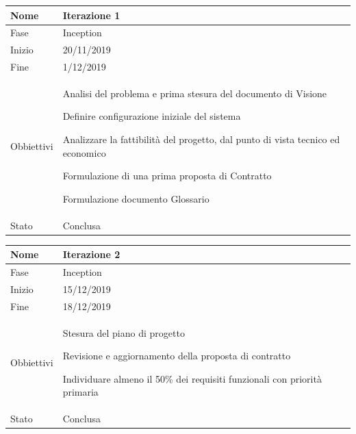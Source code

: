 \begin{center}

\begin{tabular}{ |p{2cm}|p{10cm}|  }
\hline
Nome & Iterazione 1 \\\hline
Fase & Inception \\\hline
Inizio & 20/11/2019 \\\hline
Fine &  1/12/2019 \\\hline
Obbiettivi & 
	\begin{compactitem}
		\item Analisi del problema e prima stesura del documento di Visione
		\item Definire configurazione iniziale del sistema
		\item Analizzare la fattibilità del progetto, dal punto di vista tecnico ed economico
		\item Formulazione di una prima proposta di Contratto
		\item Formulazione documento Glossario
	\end{compactitem}\\\hline
Stato &  Conclusa \\\hline
\end{tabular}
\label{table:1}\newline

\begin{tabular}{ |p{2cm}|p{10cm}|  }
\hline
Nome & Iterazione 2 \\\hline
Fase & Inception \\\hline
Inizio & 15/12/2019 \\\hline
Fine &  18/12/2019 \\\hline
Obbiettivi & 
	\begin{compactitem}
		\item Stesura del piano di progetto
		\item Revisione e aggiornamento della proposta di contratto
		\item Individuare almeno il 50\% dei requisiti funzionali con priorità primaria
	\end{compactitem}\\\hline
Stato &  Conclusa \\\hline
\end{tabular}
\label{table:2}\newline


\end{center}
